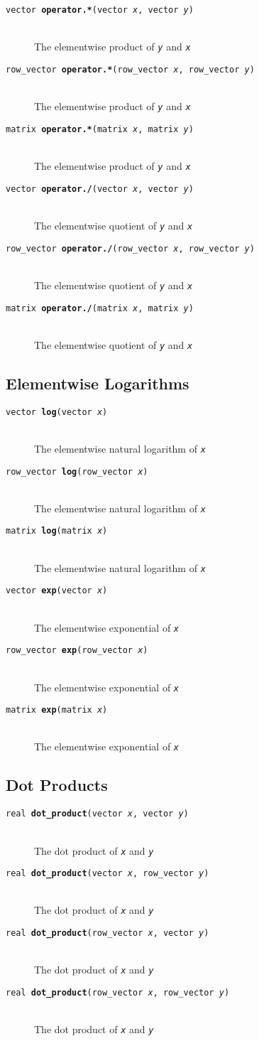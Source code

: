 \documentclass[10pt]{report}
\newcommand{\fitem}[4]{\item[{\tt #1 {\bfseries #2}(#3)}]\mbox{ } \\[4pt] #4}
\newcommand{\farg}[1]{{\tt\slshape #1}}
\begin{document}
\begin{description}
%
\fitem{vector}{operator.*}{vector \farg{x}, vector \farg{y}}{The
elementwise product of \farg{y} and \farg{x}}
%
\fitem{row\_vector}{operator.*}{row\_vector \farg{x}, row\_vector \farg{y}}{The
elementwise product of \farg{y} and \farg{x}}
%
\fitem{matrix}{operator.*}{matrix \farg{x}, matrix \farg{y}}{The
elementwise product of \farg{y} and \farg{x}}
\end{description}
\vspace*{-4pt}
\begin{description}
\fitem{vector}{operator./}{vector \farg{x}, vector \farg{y}}{The
elementwise quotient of \farg{y} and \farg{x}}
%
\fitem{row\_vector}{operator./}{row\_vector \farg{x}, row\_vector \farg{y}}{The
elementwise quotient of \farg{y} and \farg{x}}
%
\fitem{matrix}{operator./}{matrix \farg{x}, matrix \farg{y}}{The
elementwise quotient of \farg{y} and \farg{x}}
%
\end{description}
\vspace*{-4pt}

\subsection{Elementwise Logarithms}

\begin{description}
%
\fitem{vector}{log}{vector \farg{x}}{
The elementwise natural logarithm of \farg{x}}
%
\fitem{row\_vector}{log}{row\_vector \farg{x}}{
The elementwise natural logarithm of \farg{x}}
%
\fitem{matrix}{log}{matrix \farg{x}}{
The elementwise natural logarithm of \farg{x}}
%
\fitem{vector}{exp}{vector \farg{x}}{
The elementwise exponential of \farg{x}}
%
\fitem{row\_vector}{exp}{row\_vector \farg{x}}{
The elementwise exponential of \farg{x}}
%
\fitem{matrix}{exp}{matrix \farg{x}}{
The elementwise exponential of \farg{x}}
\end{description}



\subsection{Dot Products}

\begin{description}
%
\fitem{real}{dot\_product}{vector \farg{x}, vector \farg{y}}{
The dot product of \farg{x} and \farg{y}}
%
\fitem{real}{dot\_product}{vector \farg{x}, row\_vector \farg{y}}{
The dot product of \farg{x} and \farg{y}}
%
\fitem{real}{dot\_product}{row\_vector \farg{x}, vector \farg{y}}{
The dot product of \farg{x} and \farg{y}}
%
\fitem{real}{dot\_product}{row\_vector \farg{x}, row\_vector \farg{y}}{
The dot product of \farg{x} and \farg{y}}
%
\end{description}
\end{document}
